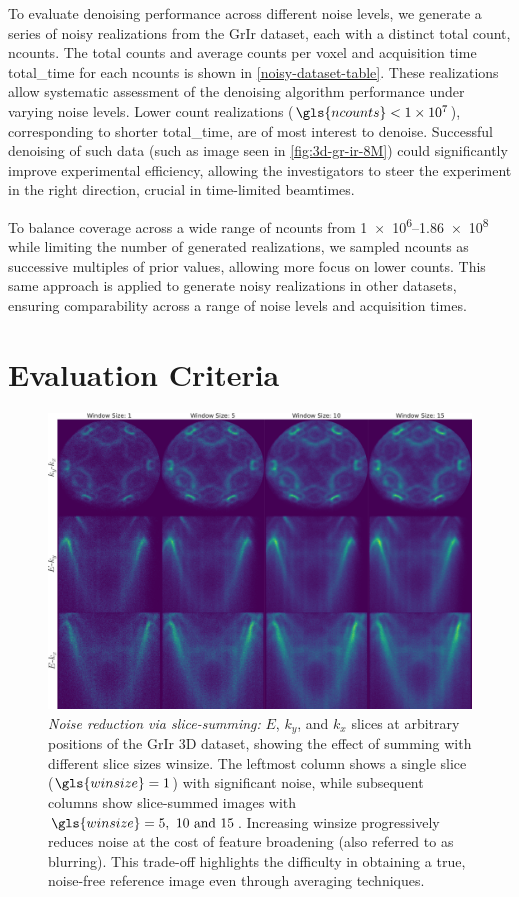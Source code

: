 To evaluate denoising performance across different noise levels, we generate a series of noisy realizations from the \gls{GrIr} dataset, each with a distinct total count, \gls{ncounts}. The total counts and average counts per voxel and acquisition time \gls{total_time} for each \gls{ncounts} is shown in \cref{noisy-dataset-table}. These realizations allow systematic assessment of the denoising algorithm performance under varying noise levels. Lower count realizations ($\gls{ncounts}<\num{1e7}$), corresponding to shorter \gls{total_time}, are of most interest to denoise. Successful denoising of such data (such as image seen in \cref{fig:3d-gr-ir-8M}) could significantly improve experimental efficiency, allowing the investigators to steer the experiment in the right direction, crucial in time-limited \glspl{beamtime}.

To balance coverage across a wide range of \gls{ncounts} from \numrange{1e6}{1.86e8} while limiting the number of generated realizations, we sampled \gls{ncounts} as successive multiples of prior values, allowing more focus on lower counts. This same approach is applied to generate noisy realizations in other datasets, ensuring comparability across a range of noise levels and acquisition times.

\section{Evaluation Criteria}
\begin{figure}
    \centering
    \includegraphics[width=1\linewidth]{images/slices.pdf}
    \caption{\textit{Noise reduction via slice-summing:} $E$, $k_y$, and $k_x$ slices at arbitrary positions of the \gls{GrIr} 3D dataset, showing the effect of summing with different slice sizes \gls{winsize}. The leftmost column shows a single slice ($\gls{winsize}=1$) with significant noise, while subsequent columns show slice-summed images with $\gls{winsize}=\numlist{5;10;15}$. Increasing \gls{winsize} progressively reduces noise at the cost of feature broadening (also referred to as blurring). This trade-off highlights the difficulty in obtaining a true, noise-free reference image even through averaging techniques.}
    \label{fig:slices}
\end{figure}

